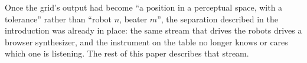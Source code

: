 Once the grid's output had become ``a position in a perceptual space,
with a tolerance'' rather than ``robot $n$, beater $m$'', the
separation described in the introduction was already in place: the
same stream that drives the robots drives a browser synthesizer, and
the instrument on the table no longer knows or cares which one is
listening. The rest of this paper describes that stream.
